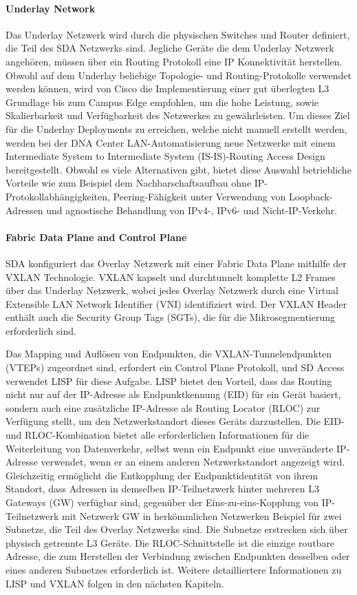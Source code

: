 \paragraph{Underlay Network}
Das Underlay Netzwerk wird durch die physischen Switches und Router definiert, die Teil des SDA Netzwerks sind. Jegliche Geräte die dem Underlay Netzwerk angehören, müssen über ein Routing Protokoll eine IP Konnektivität herstellen. Obwohl auf dem Underlay beliebige Topologie- und Routing-Protokolle verwendet werden können, wird von Cisco die Implementierung einer gut überlegten L3 Grundlage bis zum Campus Edge empfohlen, um die hohe Leistung, sowie Skalierbarkeit und Verfügbarkeit des Netzwerkes zu gewährleisten. 
Um dieses Ziel für die Underlay Deployments zu erreichen, welche nicht manuell erstellt werden, werden bei der DNA Center LAN-Automatisierung neue Netzwerke mit einem Intermediate System to Intermediate System (IS-IS)-Routing Access Design bereitgestellt. Obwohl es viele Alternativen gibt, bietet diese Auswahl betriebliche Vorteile wie zum Beispiel dem Nachbarschaftsaufbau ohne IP-Protokollabhängigkeiten, Peering-Fähigkeit unter Verwendung von Loopback-Adressen und agnostische Behandlung von IPv4-, IPv6- und Nicht-IP-Verkehr. \cite{sda-designguide}

\paragraph{Fabric Data Plane and Control Plane}
SDA konfiguriert das Overlay Netzwerk mit einer Fabric Data Plane mithilfe der VXLAN Technologie. VXLAN kapselt und durchtunnelt komplette L2 Frames über das Underlay Netzwerk, wobei jedes Overlay Netzwerk durch eine Virtual Extensible LAN Network Identifier (VNI) identifiziert wird. Der VXLAN Header enthält auch die Security Group Tags (SGTs), die für die Mikrosegmentierung erforderlich sind.

Das Mapping und Auflösen von Endpunkten, die VXLAN-Tunnelendpunkten (VTEPs) zugeordnet sind, erfordert ein Control Plane Protokoll, und SD Access verwendet LISP für diese Aufgabe. LISP bietet den Vorteil, dass das Routing nicht nur auf der IP-Adresse als Endpunktkennung (EID) für ein Gerät basiert, sondern auch eine zusätzliche IP-Adresse als Routing Locator (RLOC) zur Verfügung stellt, um den Netzwerkstandort dieses Geräts darzustellen. Die EID- und RLOC-Kombination bietet alle erforderlichen Informationen für die Weiterleitung von Datenverkehr, selbst wenn ein Endpunkt eine unveränderte IP-Adresse verwendet, wenn er an einem anderen Netzwerkstandort angezeigt wird. Gleichzeitig ermöglicht die Entkopplung der Endpunktidentität von ihrem Standort, dass Adressen in demselben IP-Teilnetzwerk hinter mehreren L3 Gateways (GW) verfügbar sind, gegenüber der Eins-zu-eins-Kopplung von IP-Teilnetzwerk mit Netzwerk GW in herkömmlichen Netzwerken Beispiel für zwei Subnetze, die Teil des Overlay Netzwerks sind. Die Subnetze erstrecken sich über physisch getrennte L3 Geräte. Die RLOC-Schnittstelle ist die einzige routbare Adresse, die zum Herstellen der Verbindung zwischen Endpunkten desselben oder eines anderen Subnetzes erforderlich ist. Weitere detailliertere Informationen zu LISP und VXLAN folgen in den nächsten Kapiteln. \cite{sda-designguide} \\


